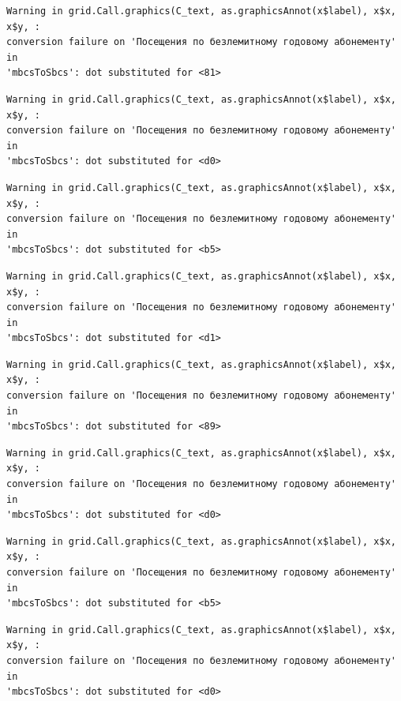 \documentclass[
  letterpaper,
  DIV=11,
  numbers=noendperiod]{scrartcl}
\begin{document}
\begin{verbatim}
Warning in grid.Call.graphics(C_text, as.graphicsAnnot(x$label), x$x, x$y, :
conversion failure on 'Посещения по безлемитному годовому абонементу' in
'mbcsToSbcs': dot substituted for <81>
\end{verbatim}

\begin{verbatim}
Warning in grid.Call.graphics(C_text, as.graphicsAnnot(x$label), x$x, x$y, :
conversion failure on 'Посещения по безлемитному годовому абонементу' in
'mbcsToSbcs': dot substituted for <d0>
\end{verbatim}

\begin{verbatim}
Warning in grid.Call.graphics(C_text, as.graphicsAnnot(x$label), x$x, x$y, :
conversion failure on 'Посещения по безлемитному годовому абонементу' in
'mbcsToSbcs': dot substituted for <b5>
\end{verbatim}

\begin{verbatim}
Warning in grid.Call.graphics(C_text, as.graphicsAnnot(x$label), x$x, x$y, :
conversion failure on 'Посещения по безлемитному годовому абонементу' in
'mbcsToSbcs': dot substituted for <d1>
\end{verbatim}

\begin{verbatim}
Warning in grid.Call.graphics(C_text, as.graphicsAnnot(x$label), x$x, x$y, :
conversion failure on 'Посещения по безлемитному годовому абонементу' in
'mbcsToSbcs': dot substituted for <89>
\end{verbatim}

\begin{verbatim}
Warning in grid.Call.graphics(C_text, as.graphicsAnnot(x$label), x$x, x$y, :
conversion failure on 'Посещения по безлемитному годовому абонементу' in
'mbcsToSbcs': dot substituted for <d0>
\end{verbatim}

\begin{verbatim}
Warning in grid.Call.graphics(C_text, as.graphicsAnnot(x$label), x$x, x$y, :
conversion failure on 'Посещения по безлемитному годовому абонементу' in
'mbcsToSbcs': dot substituted for <b5>
\end{verbatim}

\begin{verbatim}
Warning in grid.Call.graphics(C_text, as.graphicsAnnot(x$label), x$x, x$y, :
conversion failure on 'Посещения по безлемитному годовому абонементу' in
'mbcsToSbcs': dot substituted for <d0>
\end{verbatim}
\end{document}
